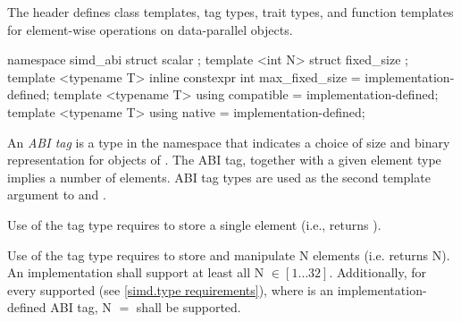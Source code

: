 

\pnum
The header  defines class templates, tag types, trait types, and function templates for element-wise operations on data-parallel objects.


\begin{itemdecl}
namespace simd_abi {
  struct scalar {};
  template <int N> struct fixed_size {};
  template <typename T> inline constexpr int max_fixed_size = implementation-defined;
  template <typename T> using compatible = implementation-defined;
  template <typename T> using native = implementation-defined;
}
\end{itemdecl}
\begin{itemdescr}
  \pnum
  An \emph{ABI tag} is a type in the  namespace that indicates a choice of size and binary representation for objects of \dataparalleltype.
  The ABI tag, together with a given element type implies a number of elements.
  ABI tag types are used as the second template argument to \simd and \mask.

  \pnum
  Use of the  tag type requires \dataparalleltypes to store a single element (i.e., \simd{} returns ).

  \pnum\label{simd.fixedsize.def}%
  Use of the \fixedsizeN tag type requires \dataparalleltypes to store and manipulate \code N elements (i.e. \simd{} returns \code N).
  An implementation shall support at least all \code N $\in [1\ldots 32]$.
  Additionally, for every supported \simd[<T, Abi>] (see \ref{simd.type requirements}), where  is an implementation-defined ABI tag, \code N $=$  shall be supported.



\end{itemdescr}
